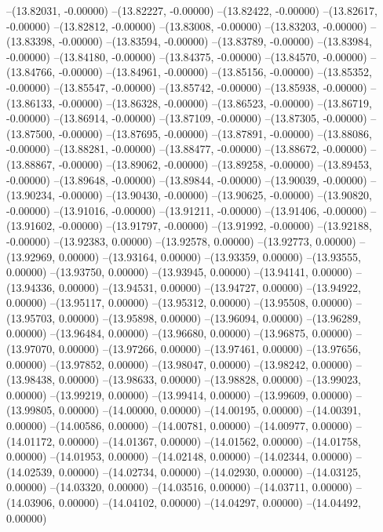 --(13.82031, -0.00000)
--(13.82227, -0.00000)
--(13.82422, -0.00000)
--(13.82617, -0.00000)
--(13.82812, -0.00000)
--(13.83008, -0.00000)
--(13.83203, -0.00000)
--(13.83398, -0.00000)
--(13.83594, -0.00000)
--(13.83789, -0.00000)
--(13.83984, -0.00000)
--(13.84180, -0.00000)
--(13.84375, -0.00000)
--(13.84570, -0.00000)
--(13.84766, -0.00000)
--(13.84961, -0.00000)
--(13.85156, -0.00000)
--(13.85352, -0.00000)
--(13.85547, -0.00000)
--(13.85742, -0.00000)
--(13.85938, -0.00000)
--(13.86133, -0.00000)
--(13.86328, -0.00000)
--(13.86523, -0.00000)
--(13.86719, -0.00000)
--(13.86914, -0.00000)
--(13.87109, -0.00000)
--(13.87305, -0.00000)
--(13.87500, -0.00000)
--(13.87695, -0.00000)
--(13.87891, -0.00000)
--(13.88086, -0.00000)
--(13.88281, -0.00000)
--(13.88477, -0.00000)
--(13.88672, -0.00000)
--(13.88867, -0.00000)
--(13.89062, -0.00000)
--(13.89258, -0.00000)
--(13.89453, -0.00000)
--(13.89648, -0.00000)
--(13.89844, -0.00000)
--(13.90039, -0.00000)
--(13.90234, -0.00000)
--(13.90430, -0.00000)
--(13.90625, -0.00000)
--(13.90820, -0.00000)
--(13.91016, -0.00000)
--(13.91211, -0.00000)
--(13.91406, -0.00000)
--(13.91602, -0.00000)
--(13.91797, -0.00000)
--(13.91992, -0.00000)
--(13.92188, -0.00000)
--(13.92383, 0.00000)
--(13.92578, 0.00000)
--(13.92773, 0.00000)
--(13.92969, 0.00000)
--(13.93164, 0.00000)
--(13.93359, 0.00000)
--(13.93555, 0.00000)
--(13.93750, 0.00000)
--(13.93945, 0.00000)
--(13.94141, 0.00000)
--(13.94336, 0.00000)
--(13.94531, 0.00000)
--(13.94727, 0.00000)
--(13.94922, 0.00000)
--(13.95117, 0.00000)
--(13.95312, 0.00000)
--(13.95508, 0.00000)
--(13.95703, 0.00000)
--(13.95898, 0.00000)
--(13.96094, 0.00000)
--(13.96289, 0.00000)
--(13.96484, 0.00000)
--(13.96680, 0.00000)
--(13.96875, 0.00000)
--(13.97070, 0.00000)
--(13.97266, 0.00000)
--(13.97461, 0.00000)
--(13.97656, 0.00000)
--(13.97852, 0.00000)
--(13.98047, 0.00000)
--(13.98242, 0.00000)
--(13.98438, 0.00000)
--(13.98633, 0.00000)
--(13.98828, 0.00000)
--(13.99023, 0.00000)
--(13.99219, 0.00000)
--(13.99414, 0.00000)
--(13.99609, 0.00000)
--(13.99805, 0.00000)
--(14.00000, 0.00000)
--(14.00195, 0.00000)
--(14.00391, 0.00000)
--(14.00586, 0.00000)
--(14.00781, 0.00000)
--(14.00977, 0.00000)
--(14.01172, 0.00000)
--(14.01367, 0.00000)
--(14.01562, 0.00000)
--(14.01758, 0.00000)
--(14.01953, 0.00000)
--(14.02148, 0.00000)
--(14.02344, 0.00000)
--(14.02539, 0.00000)
--(14.02734, 0.00000)
--(14.02930, 0.00000)
--(14.03125, 0.00000)
--(14.03320, 0.00000)
--(14.03516, 0.00000)
--(14.03711, 0.00000)
--(14.03906, 0.00000)
--(14.04102, 0.00000)
--(14.04297, 0.00000)
--(14.04492, 0.00000)

